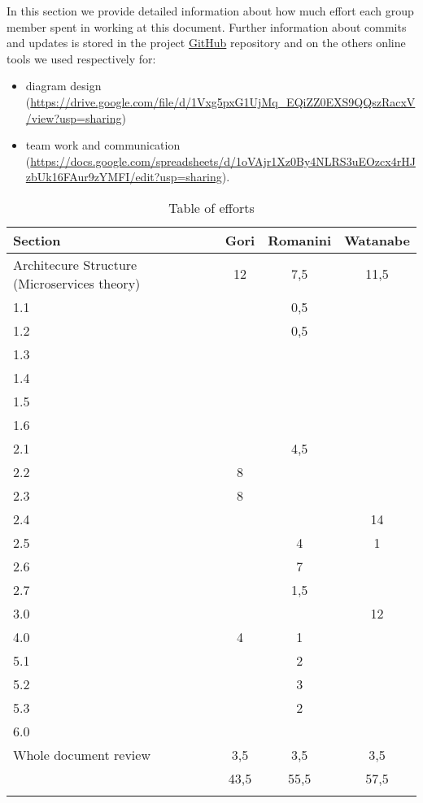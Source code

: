 In this section we provide detailed information about how much effort each group member spent in working at this document. Further information about commits and updates is stored in the project \href{https://github.com/MarcoRomanini/GoriRomaniniWatanabe}{GitHub} repository and on the others online tools we used respectively for:
\begin{itemize}
    \item diagram design (\url{https://drive.google.com/file/d/1Vxg5pxG1UjMq_EQiZZ0EXS9QQszRacxV/view?usp=sharing})
    \item team work and communication (\url{https://docs.google.com/spreadsheets/d/1oVAjr1Xz0By4NLRS3uEOzcx4rHJzbUk16FAur9zYMFI/edit?usp=sharing}).
\end{itemize}

\begin{center}
    \setlength\arrayrulewidth{1pt}
    \begin{longtable}{lccc}
        
        \hline
        \rowcolor{myblue}\color{white}Section & \color{white}Gori & \color{white}Romanini & \color{white}Watanabe \\
        \hline
        Architecure Structure (Microservices theory) & 12 & 7,5 & 11,5 \\
        \hline
        1.1 & & 0,5 & \\
        \hline
        1.2 & & 0,5 & \\
        \hline
        1.3 & & & \\
        \hline
        1.4 & & & \\
        \hline
        1.5 & & & \\
        \hline
        1.6 & & & \\
        \hline
        2.1 & & 4,5 & \\
        \hline
        2.2 & 8 & & \\
        \hline
        2.3 & 8 & & \\
        \hline
        2.4 & & & 14 \\
        \hline
        2.5 & & 4 & 1 \\
        \hline
        2.6 & & 7 & \\
        \hline
        2.7 & & 1,5 & \\
        \hline
        3.0 & & & 12 \\
        \hline
        4.0 & 4 & 1 & \\
        \hline
        5.1 & & 2 & \\
        \hline
        5.2 & & 3 & \\
        \hline
        5.3 & & 2 & \\
        \hline
        6.0 & & & \\
        \hline
        Whole document review & 3,5 & 3,5 & 3,5 \\
        \hline
        & 43,5 & 55,5 & 57,5 \\
        \hline
        
        \rowcolor{white}\caption{\label{tab:effort}Table of efforts}
        
    \end{longtable}
\end{center}

